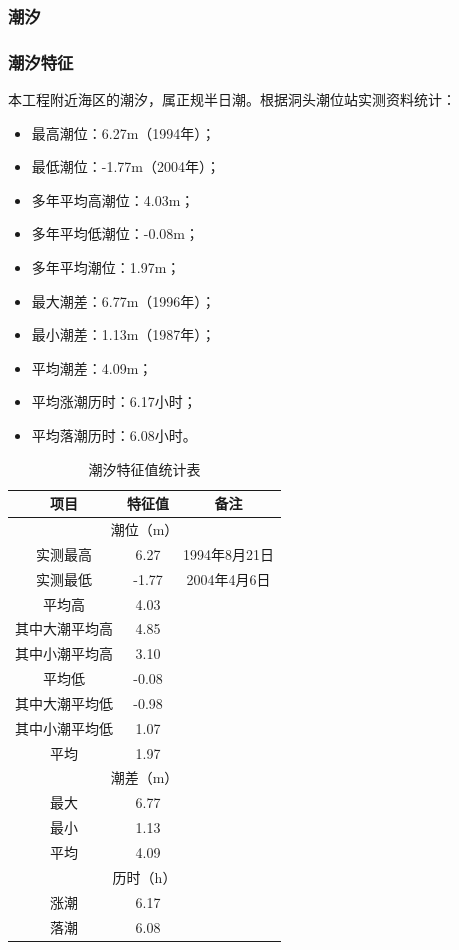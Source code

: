 \documentclass[UTF8, a4paper, 12pt]{ctexart} %
\begin{document}
\subsubsection{潮汐}

\subsubsection{潮汐特征}
本工程附近海区的潮汐，属正规半日潮。根据洞头潮位站实测资料统计：
\begin{itemize}
    \item 最高潮位：6.27m（1994年）；
    \item 最低潮位：-1.77m（2004年）；
    \item 多年平均高潮位：4.03m；
    \item 多年平均低潮位：-0.08m；
    \item 多年平均潮位：1.97m；
    \item 最大潮差：6.77m（1996年）；
    \item 最小潮差：1.13m（1987年）；
    \item 平均潮差：4.09m；
    \item 平均涨潮历时：6.17小时；
    \item 平均落潮历时：6.08小时。
\end{itemize}
\begin{table}[h]
    \centering
    \caption{潮汐特征值统计表}
    \begin{tabular}{|c|c|c|}
        \hline
        项目 & 特征值 & 备注 \\ \hline
        \multicolumn{3}{|c|}{潮位（m）} \\ \hline
        实测最高 & 6.27 & 1994年8月21日 \\ \hline
        实测最低 & -1.77 & 2004年4月6日 \\ \hline
        平均高 & 4.03 & \\ \hline
        其中大潮平均高 & 4.85 & \\ \hline
        其中小潮平均高 & 3.10 & \\ \hline
        平均低 & -0.08 & \\ \hline
        其中大潮平均低 & -0.98 & \\ \hline
        其中小潮平均低 & 1.07 & \\ \hline
        平均 & 1.97 & \\ \hline
        \multicolumn{3}{|c|}{潮差（m）} \\ \hline
        最大 & 6.77 & \\ \hline
        最小 & 1.13 & \\ \hline
        平均 & 4.09 & \\ \hline
        \multicolumn{3}{|c|}{历时（h）} \\ \hline
        涨潮 & 6.17 & \\ \hline
        落潮 & 6.08 & \\ \hline
    \end{tabular}
    \label{tab:tide_characteristics}
\end{table}
\end{document}
